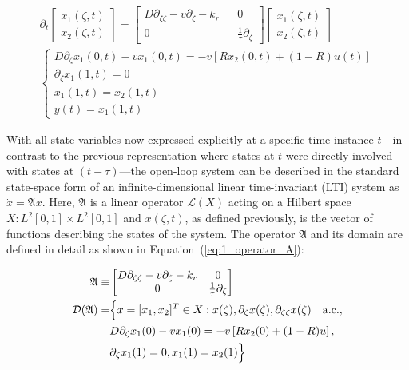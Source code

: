 \begin{align}
    \partial_t 
    \begin{bmatrix}
        x_1(\zeta, t) \\ x_2(\zeta,t)
    \end{bmatrix}
    =
    \begin{bmatrix}
        D \partial_{\zeta \zeta} - v \partial_\zeta - k_r && 0 \\
        0 && \frac{1}{\tau} \partial_\zeta
    \end{bmatrix}
    \begin{bmatrix}
        x_1(\zeta, t) \\ x_2(\zeta,t)
    \end{bmatrix}\\
\begin{cases}
    D \partial_\zeta x_1(0, t) - v x_1(0, t) = -v \left[ R x_2(0, t) + (1-R) u(t) \right] \\
    \partial_\zeta x_1(1, t) = 0 \\
    x_1(1,t) = x_2(1,t) \\
    y(t) = x_1(1, t)
\end{cases}
\end{align}

With all state variables now expressed explicitly at a specific time instance $t$—in contrast to the previous representation where states at $t$ were directly involved with states at $(t-\tau)$—the open-loop system can be described in the standard state-space form of an infinite-dimensional linear time-invariant (LTI) system as $\dot{{x}} = \mathfrak{A} {x}$. Here, $\mathfrak{A}$ is a linear operator $\mathcal{L}(X)$ acting on a Hilbert space $X: L^2[0,1] \times L^2[0,1]$ and ${x}(\zeta,t)$, as defined previously, is the vector of functions describing the states of the system. The operator $\mathfrak{A}$ and its domain are defined in detail as shown in Equation~(\ref{eq:1_operator_A}):

\begin{equation} \label{eq:1_operator_A}
    \begin{aligned}
        \mathfrak{A} \equiv&
        \begin{bmatrix}
            D \partial_{\zeta \zeta} - v \partial_\zeta - k_r & 0 \\
            0 & \frac{1}{\tau} \partial_\zeta
        \end{bmatrix}\\
        \mathcal{D}(\mathfrak{A}) =& \Bigl\{ {x} = [x_1, x_2]^T \in X:
        {x}(\zeta), \partial_\zeta {x}(\zeta), \partial_{\zeta \zeta} {x}(\zeta) \quad \mathrm{a.c.},\\
        &D \partial_\zeta x_1(0) - v x_1(0) = -v \left[ R x_2(0) + (1-R) u \right],\\
        &\partial_\zeta x_1(1) = 0,
        x_1(1) = x_2(1) \Bigr\}
    \end{aligned}
\end{equation}

